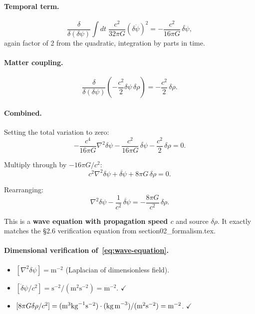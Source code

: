 \documentclass[aps,prd,twocolumn,nofootinbib]{revtex4-2}
\newcommand{\dpsi}{\delta\psi}
\begin{document}
\paragraph{Temporal term.}
\begin{equation}
\frac{\delta}{\delta(\dpsi)}\int dt\;\frac{c^2}{32\pi G}(\delta\dot\psi)^2
= -\frac{c^2}{16\pi G}\,\ddot{\dpsi},
\end{equation}
again factor of 2 from the quadratic, integration by parts in time.

\paragraph{Matter coupling.}
\begin{equation}
\frac{\delta}{\delta(\dpsi)}\left(-\frac{c^2}{2}\dpsi\,\delta\rho\right)
= -\frac{c^2}{2}\,\delta\rho.
\end{equation}

\paragraph{Combined.} Setting the total variation to zero:
\begin{equation}
-\frac{c^4}{16\pi G}\nabla^2\dpsi
-\frac{c^2}{16\pi G}\,\ddot{\dpsi}
-\frac{c^2}{2}\,\delta\rho = 0.
\end{equation}

Multiply through by $-16\pi G/c^2$:
\begin{equation}
c^2\nabla^2\dpsi + \ddot{\dpsi} + 8\pi G\,\delta\rho = 0.
\end{equation}

Rearranging:
\begin{equation}
\boxed{
\nabla^2\dpsi - \frac{1}{c^2}\,\ddot{\dpsi} = -\frac{8\pi G}{c^2}\,\delta\rho.
}
\label{eq:wave-equation}
\end{equation}

This is a \textbf{wave equation with propagation speed $c$} and source
$\delta\rho$. It exactly matches the \S2.6 verification equation from
section02\_formalism.tex.

\paragraph{Dimensional verification of~\eqref{eq:wave-equation}.}
\begin{itemize}
\item $[\nabla^2\dpsi] = \text{m}^{-2}$ (Laplacian of dimensionless field).
\item $[\ddot\dpsi/c^2] = \text{s}^{-2}/(\text{m}^2\text{s}^{-2})
  = \text{m}^{-2}$. $\checkmark$
\item $[8\pi G\delta\rho/c^2] = (\text{m}^3\text{kg}^{-1}\text{s}^{-2})
  \cdot(\text{kg\,m}^{-3})/(\text{m}^2\text{s}^{-2})
  = \text{m}^{-2}$. $\checkmark$
\end{itemize}
\end{document}
